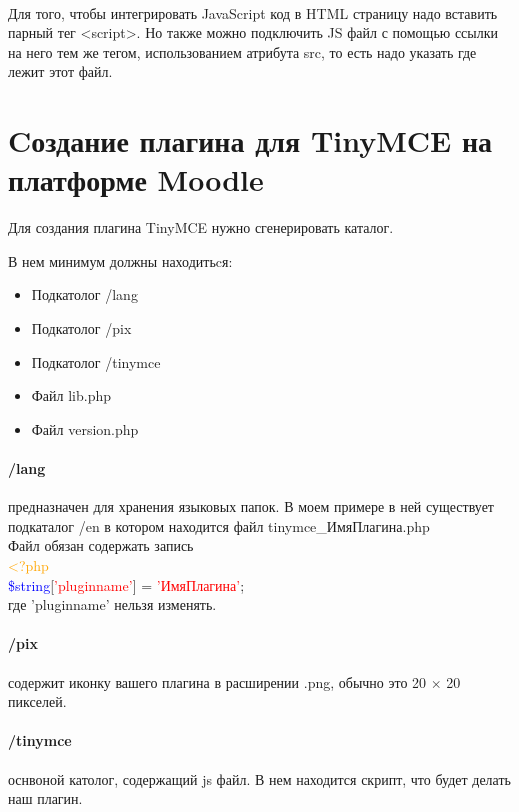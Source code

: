 \documentclass[14pt,Diplom]{diplomwork}
\begin{document}
\paragraph{}
Для того, чтобы интегрировать JavaScript код в HTML страницу надо вставить парный тег <script>. Но также можно подключить JS файл с помощью ссылки на него тем же тегом, использованием атрибута src, то есть надо указать где лежит этот файл.

\section{Cоздание плагина для TinyMCE на платформе Moodle}
Для создания плагина TinyMCE нужно сгенерировать каталог.

В нем минимум должны находитьcя:

\begin{itemize}
	\item Подкатолог /lang
	\item Подкатолог /pix
	\item Подкатолог /tinymce
	\item Файл lib.php
	\item Файл version.php
\end{itemize}

\paragraph{/lang}
 предназначен для хранения языковых папок. В моем примере в ней существует подкаталог /en в котором находится файл tinymce\_ИмяПлагина.php\\
 Файл обязан содержать запись\\
  \textcolor{orange}{<?php} \\
  \textcolor{blue}{\$string}[\textcolor{red}{'pluginname'}] = \textcolor{red}{'ИмяПлагина'};\\
  где 'pluginname' нельзя изменять.

\paragraph{/pix}
содержит иконку вашего плагина в расширении .png, обычно это 20 $\times$ 20 пикселей.

\paragraph{/tinymce}
оснвоной католог, содержащий js файл. В нем находится скрипт, что будет делать наш плагин.
\end{document}
